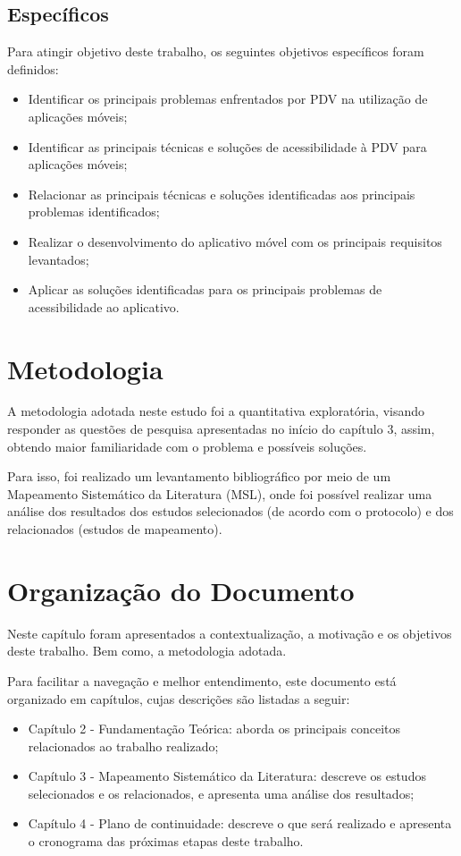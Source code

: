 \subsection{Específicos}

Para atingir objetivo deste trabalho, os seguintes objetivos específicos foram definidos:

\begin{itemize}
    \item Identificar os principais problemas enfrentados por PDV na utilização de aplicações móveis;
    \item Identificar as principais técnicas e soluções de acessibilidade à PDV para aplicações móveis;
    \item Relacionar as principais técnicas e soluções identificadas aos principais problemas identificados;
    \item Realizar o desenvolvimento do aplicativo móvel com os principais requisitos levantados;
    \item Aplicar as soluções identificadas para os principais problemas de acessibilidade ao aplicativo.
\end{itemize}

\section{Metodologia}

A metodologia adotada neste estudo foi a quantitativa exploratória, visando responder as questões de pesquisa apresentadas
no início do capítulo 3, assim, obtendo maior familiaridade com o problema e possíveis soluções.

Para isso, foi realizado um levantamento bibliográfico por meio de um Mapeamento Sistemático da Literatura (MSL), onde foi possível
realizar uma análise dos resultados dos estudos selecionados (de acordo com o protocolo) e dos relacionados (estudos de mapeamento).

\section{Organização do Documento}
Neste capítulo foram apresentados a contextualização, a motivação e os objetivos deste trabalho. Bem como, a metodologia adotada.

Para facilitar a navegação e melhor entendimento, este documento está organizado em capítulos, cujas descrições são listadas a seguir:
\begin{itemize}
    \item Capítulo 2 - Fundamentação Teórica: aborda os principais conceitos relacionados ao trabalho realizado;
    \item Capítulo 3 - Mapeamento Sistemático da Literatura: descreve os estudos selecionados e os relacionados, e apresenta uma análise dos resultados;
    \item Capítulo 4 - Plano de continuidade: descreve o que será realizado e apresenta o cronograma das próximas etapas deste trabalho.
\end{itemize}

